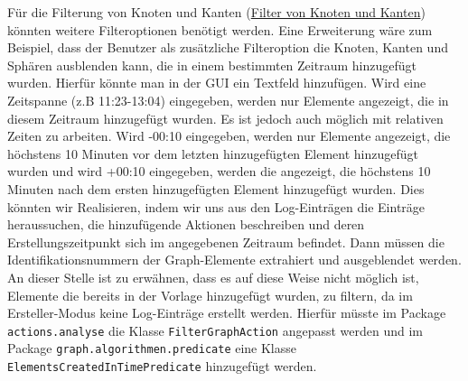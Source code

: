 \documentclass[enabledeprecatedfontcommands,fontsize=11pt,paper=a4,twoside]{scrartcl}
\newcounter{one}
\begin{document}
Für die Filterung von Knoten und Kanten (\hyperlink{ss}{Filter von Knoten und Kanten}) könnten weitere Filteroptionen benötigt werden. Eine Erweiterung wäre zum Beispiel, dass der Benutzer als zusätzliche Filteroption die Knoten, Kanten und Sphären ausblenden kann, die in einem bestimmten Zeitraum hinzugefügt wurden. Hierfür könnte man in der GUI  ein Textfeld hinzufügen. Wird eine Zeitspanne (z.B 11:23-13:04) eingegeben, werden nur Elemente angezeigt, die in diesem Zeitraum hinzugefügt wurden. Es ist jedoch auch möglich mit relativen Zeiten zu arbeiten. Wird -00:10 eingegeben, werden nur Elemente angezeigt, die höchstens 10 Minuten vor dem letzten hinzugefügten Element hinzugefügt wurden und wird +00:10 eingegeben, werden die angezeigt, die höchstens 10 Minuten nach dem ersten hinzugefügten Element hinzugefügt wurden. Dies könnten wir Realisieren, indem wir uns aus den Log-Einträgen die Einträge heraussuchen, die hinzufügende Aktionen beschreiben und deren Erstellungszeitpunkt sich im angegebenen Zeitraum befindet. Dann müssen die Identifikationsnummern der Graph-Elemente extrahiert und ausgeblendet werden. An dieser Stelle ist zu erwähnen, dass es auf diese Weise nicht möglich ist, Elemente die bereits in der Vorlage hinzugefügt wurden, zu filtern, da im Ersteller-Modus keine Log-Einträge erstellt werden. Hierfür müsste im Package \texttt{actions.analyse} die Klasse \texttt{FilterGraphAction} angepasst werden und im Package \texttt{graph.algorithmen.predicate} eine Klasse \texttt{ElementsCreatedInTimePredicate} hinzugefügt werden. \\
\end{document}
